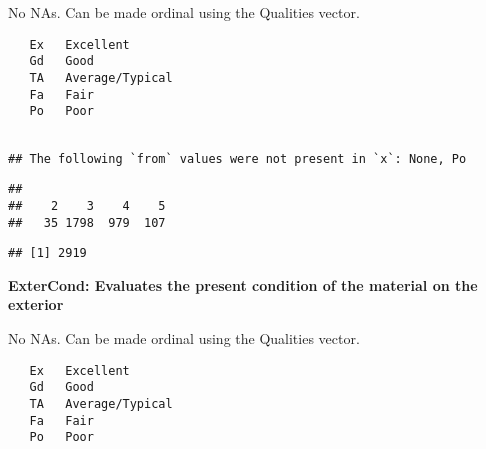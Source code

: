 \documentclass[]{article}
\newenvironment{Shaded}{\begin{snugshade}}{\end{snugshade}}
\newcommand{\KeywordTok}[1]{\textcolor[rgb]{0.13,0.29,0.53}{\textbf{#1}}}
\newcommand{\OperatorTok}[1]{\textcolor[rgb]{0.81,0.36,0.00}{\textbf{#1}}}
\newcommand{\NormalTok}[1]{#1}
\begin{document}
No NAs. Can be made ordinal using the Qualities vector.

\begin{verbatim}
   Ex   Excellent
   Gd   Good
   TA   Average/Typical
   Fa   Fair
   Po   Poor
   
\end{verbatim}

\begin{Shaded}
\end{Shaded}

\begin{verbatim}
## The following `from` values were not present in `x`: None, Po
\end{verbatim}

\begin{Shaded}
\end{Shaded}

\begin{verbatim}
## 
##    2    3    4    5 
##   35 1798  979  107
\end{verbatim}

\begin{Shaded}
\end{Shaded}

\begin{verbatim}
## [1] 2919
\end{verbatim}

\textbf{ExterCond: Evaluates the present condition of the material on
the exterior}

No NAs. Can be made ordinal using the Qualities vector.

\begin{verbatim}
   Ex   Excellent
   Gd   Good
   TA   Average/Typical
   Fa   Fair
   Po   Poor
\end{verbatim}

\begin{Shaded}
\end{Shaded}
\end{document}
